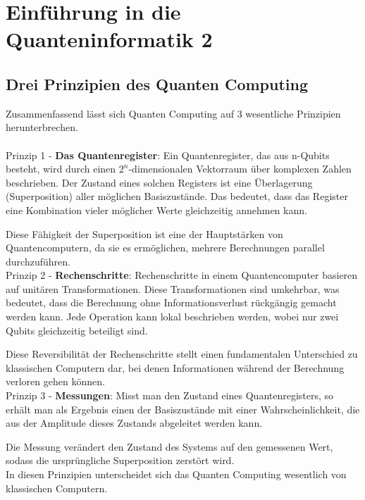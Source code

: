 \section{Einführung in die Quanteninformatik 2}
\label{sec:einfuehrung-in-die-quanteninformatik-2}

\subsection{Drei Prinzipien des Quanten Computing}
\label{subsec:drei-prinzipien-des-quanten-computing}

Zusammenfassend lässt sich Quanten Computing auf 3 wesentliche Prinzipien herunterbrechen.\\\\
\textbullet Prinzip 1 - \textbf{Das Quantenregister}: Ein Quantenregister, das aus n-Qubits besteht, wird durch einen $2^n$-dimensionalen Vektorraum über komplexen Zahlen beschrieben.
Der Zustand eines solchen Registers ist eine Überlagerung (Superposition) aller möglichen Basiszustände.
Das bedeutet, dass das Register eine Kombination vieler möglicher Werte gleichzeitig annehmen kann.

Diese Fähigkeit der Superposition ist eine der Hauptstärken von Quantencomputern, da sie es ermöglichen, mehrere Berechnungen parallel durchzuführen.\\

\textbullet Prinzip 2 - \textbf{Rechenschritte}: Rechenschritte in einem Quantencomputer basieren auf unitären Transformationen.
Diese Transformationen sind umkehrbar, was bedeutet, dass die Berechnung ohne Informationsverlust rückgängig gemacht werden kann.
Jede Operation kann lokal beschrieben werden, wobei nur zwei Qubits gleichzeitig beteiligt sind.

Diese Reversibilität der Rechenschritte stellt einen fundamentalen Unterschied zu klassischen Computern dar, bei denen Informationen während der Berechnung verloren gehen können.\\

\textbullet Prinzip 3 - \textbf{Messungen}: Misst man den Zustand eines Quantenregisters, so erhält man als Ergebnis einen der Basiszustände mit einer Wahrscheinlichkeit, die aus der Amplitude dieses Zustands abgeleitet werden kann.

Die Messung verändert den Zustand des Systems auf den gemessenen Wert, sodass die ursprüngliche Superposition zerstört wird.\\

In diesen Prinzipien unterscheidet sich das Quanten Computing wesentlich von klassischen Computern.\\


